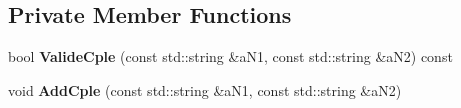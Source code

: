 \subsection*{Private Member Functions}
\begin{DoxyCompactItemize}
\item 
bool {\bfseries Valide\+Cple} (const std\+::string \&a\+N1, const std\+::string \&a\+N2) const \hypertarget{classMMVII_1_1cAppli__EditRel_a76db14056fe07975fcf890c24152327c}{}\label{classMMVII_1_1cAppli__EditRel_a76db14056fe07975fcf890c24152327c}

\item 
void {\bfseries Add\+Cple} (const std\+::string \&a\+N1, const std\+::string \&a\+N2)\hypertarget{classMMVII_1_1cAppli__EditRel_ae774718f9711e3803aae845e04454c6f}{}\label{classMMVII_1_1cAppli__EditRel_ae774718f9711e3803aae845e04454c6f}

\end{DoxyCompactItemize}

